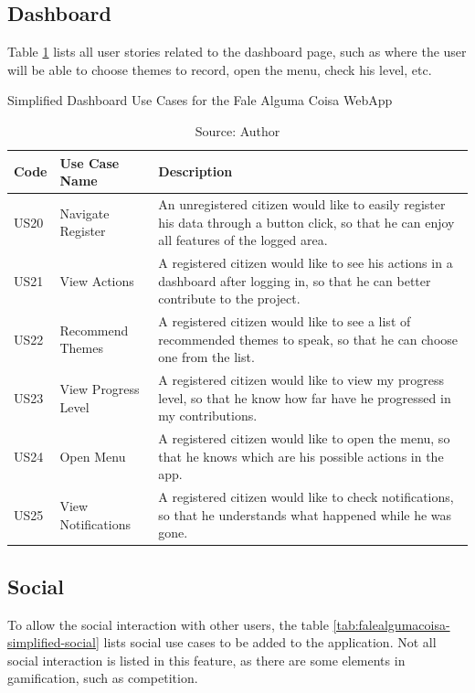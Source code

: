 \clearpage
\subsection{Dashboard}

Table \ref{tab:falealgumacoisa-simplified-dashboard} lists all user stories related to the dashboard page, such as where the user will be able to choose themes to record, open the menu, check his level, etc.

\begin{table}[h]
\caption{Simplified Dashboard Use Cases for the Fale Alguma Coisa WebApp}
\label{tab:falealgumacoisa-simplified-dashboard}
\centering
\begin{tabular}{|p{1cm}|p{3cm}|p{10cm}|}
\hline
    Code & Use Case Name & Description \\ \hline
    US20 & Navigate Register & An unregistered citizen would like to easily register his data through a button click, so that he can enjoy all features of the logged area. \\ \hline
    US21 & View Actions & A registered citizen would like to see his actions in a dashboard after logging in, so that he can better contribute to the project. \\ \hline
    US22 & Recommend Themes & A registered citizen would like to see a list of recommended themes to speak, so that he can choose one from the list. \\ \hline
    US23 & View Progress Level & A registered citizen would like to view my progress level, so that he know how far have he  progressed in my contributions. \\ \hline
    US24 & Open Menu & A registered citizen would like to open the menu, so that he knows which are his possible actions in the app. \\ \hline
    US25 & View Notifications & A registered citizen would like to check notifications, so that he understands what happened while he was gone. \\ \hline
\end{tabular}
\caption*{Source: Author}
\end{table}

\subsection{Social}

To allow the social interaction with other users, the table \ref{tab:falealgumacoisa-simplified-social} lists social use cases to be added to the application. Not all social interaction is listed in this feature, as there are some elements in gamification, such as competition.

